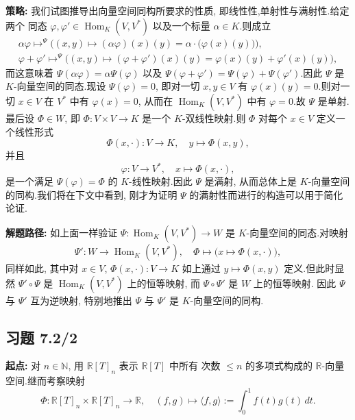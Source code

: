 \noindent\textbf{策略:} 我们试图推导出向量空间同构所要求的性质, 即线性性,单射性与满射性.给定两个
同态 $\varphi, \varphi' \in \operatorname{Hom}_K(V, V^*)$ 以及一个标量 $\alpha \in K$.则成立
\[
\begin{array}{c}
\alpha \varphi \longmapsto^{\varPsi} \bigl((x, y) \longmapsto (\alpha \varphi)(x)(y) = \alpha \cdot \bigl(\varphi(x)(y)\bigr)\bigr), \\[2pt]
\varphi + \varphi' \longmapsto^{\varPsi} \bigl((x, y) \longmapsto (\varphi + \varphi')(x)(y) = \varphi(x)(y) + \varphi'(x)(y)\bigr),
\end{array}
\]
而这意味着 $\varPsi(\alpha \varphi) = \alpha \varPsi(\varphi)$ 以及
$\varPsi(\varphi + \varphi') = \varPsi(\varphi) + \varPsi(\varphi')$.因此 $\varPsi$ 是
$K$-向量空间的同态.现设 $\varPsi(\varphi) = 0$, 即对一切 $x, y \in V$ 有
$\varphi(x)(y) = 0$.则对一切 $x \in V$ 在 $V^*$ 中有 $\varphi(x) = 0$, 从而在
$\operatorname{Hom}_K(V, V^*)$ 中有 $\varphi = 0$.故 $\varPsi$ 是单射.最后设
$\varPhi \in W$, 即 $\varPhi \colon V \times V \longrightarrow K$ 是一个 $K$-双线性映射.则
$\varPhi$ 对每个 $x \in V$ 定义一个线性形式
\[
\varPhi(x, \cdot) \colon V \longrightarrow K, \quad y \longmapsto \varPhi(x, y),
\]
并且
\[
\varphi \colon V \longrightarrow V^*, \quad x \longmapsto \varPhi(x, \cdot),
\]
是一个满足 $\varPsi(\varphi) = \varPhi$ 的 $K$-线性映射.因此 $\varPsi$ 是满射, 从而总体上是
$K$-向量空间的同构.我们将在下文中看到, 刚才为证明 $\varPsi$ 的满射性而进行的构造可以用于简化论证.

\noindent\textbf{解题路径:} 如上面一样验证
$\varPsi \colon \operatorname{Hom}_K(V, V^*) \longrightarrow W$ 是 $K$-向量空间的同态.对映射
\[
\varPsi' \colon W \longrightarrow \operatorname{Hom}_K(V, V^*), \quad \varPhi \longmapsto \bigl(x \longmapsto \varPhi(x, \cdot)\bigr),
\]
同样如此, 其中对 $x \in V$, $\varPhi(x, \cdot) \colon V \longrightarrow K$ 如上通过
$y \longmapsto \varPhi(x, y)$ 定义.但此时显然 $\varPsi' \circ \varPsi$ 是
$\operatorname{Hom}_K(V, V^*)$ 上的恒等映射, 而 $\varPsi \circ \varPsi'$ 是 $W$ 上的恒等映射.
因此 $\varPsi$ 与 $\varPsi'$ 互为逆映射, 特别地推出 $\varPsi$ 与 $\varPsi'$ 是 $K$-向量空间的同构.

\subsection*{习题 7.2/2}

\noindent\textbf{起点:} 对 $n \in \mathbb{N}$, 用 $\mathbb{R}[T]_n$ 表示 $\mathbb{R}[T]$ 中所有
次数 $\leq n$ 的多项式构成的 $\mathbb{R}$-向量空间.继而考察映射
\[
\varPhi \colon \mathbb{R}[T]_n \times \mathbb{R}[T]_n \longrightarrow \mathbb{R}, \quad (f, g) \longmapsto \langle f, g \rangle := \int_0^1 f(t) g(t)\, dt\text{.}
\]

